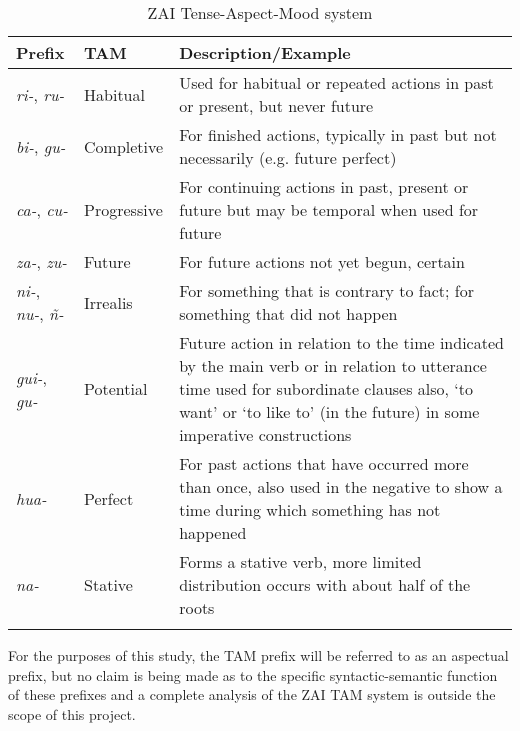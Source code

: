 \begin{table}

\begin{tabularx}{\textwidth}{llQ}
\lsptoprule
 Prefix & TAM & Description/Example \\
 
\midrule
\textit{ri-}, \textit{ru-} & Habitual & Used for habitual or repeated actions in past or present, but never future \\
 
\midrule
\textit{bi-}, \textit{gu-} & Completive & For finished actions, typically in past but not necessarily (e.g. future perfect) \\
 
\midrule
\textit{ca-}, \textit{cu-} &  Progressive & For continuing actions in past, present or future  but may be temporal when used for future \\
  
\midrule 
 \textit{za-}, \textit{zu-} & Future & For future actions not yet begun, certain \\
 
\midrule
 \textit{ni-}, \textit{nu-}, \textit{ñ-} & Irrealis & For something that is contrary to fact;  for something that did not happen \\
 
\midrule
\textit{gui-}, \textit{gu-} & Potential & Future action   in relation to the time indicated by the main verb   or in relation to utterance time  
 used for subordinate clauses  also, `to want' or `to like to' (in the future)  in some imperative constructions \\
 
\midrule
\textit{hua-} & Perfect & For past actions that have occurred more than once, also used in the negative to show a time   during which something has not happened \\
  
\midrule
\textit{na-} & Stative & Forms a stative verb,   more limited distribution occurs with about half of the roots \\
  
\lspbottomrule
 \end{tabularx}
\caption{{ZAI Tense-Aspect-Mood system}}
\label{TAMsystem}

\end{table} 


For the purposes of this study, the TAM prefix will be referred to as an aspectual prefix, but no claim is being made as to the specific syntactic-semantic function of these prefixes and a complete analysis of the ZAI TAM system is outside the scope of this project.

